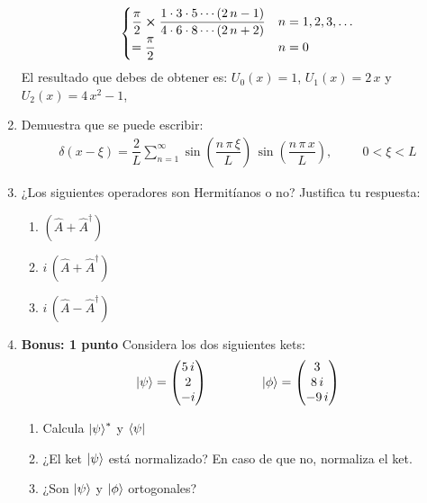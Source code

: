 \begin{enumerate}
\begin{align*}
\begin{cases}
\dfrac{\pi}{2} \cp \dfrac{1 \cdot 3 \cdot 5 \cdots (2 \, n - 1)}{4 \cdot 6 \cdot 8 \cdots (2 \, n + 2)} & n = 1, 2, 3, \ldots \\[0.5em]
= \dfrac{\pi}{2} & n = 0
\end{cases} 
\end{align*}
El resultado que debes de obtener es: $U_{0}(x) = 1$, $U_{1}(x) = 2 \, x$ y $U_{2}(x) = 4 \, x^{2} - 1$,
\item Demuestra que se puede escribir:
\begin{align*}
\delta(x - \xi) = \dfrac{2}{L} \sum_{n=1}^{\infty} \sin \left( \dfrac{n \, \pi \, \xi}{L} \right) \, \sin \left( \dfrac{n \, \pi \, x}{L} \right), \hspace{1cm} 0 < \xi < L
\end{align*}
\item ¿Los siguientes operadores son Hermitíanos o no? Justifica tu respuesta:
\begin{enumerate}
\item $(\hat{A} + \hat{A}^{\dagger})$
\item $i \, (\hat{A} + \hat{A}^{\dagger})$
\item $i \, (\hat{A} - \hat{A}^{\dagger})$
\end{enumerate}
\item \textbf{Bonus: 1 punto} Considera los dos siguientes kets:
\begin{align*}
\ket{\psi} = \mqty(5 \, i \\ 2 \\ -i) \hspace{1.5cm} \ket{\phi} = \mqty(3  \\ 8 \, i \\ - 9 \, i)
\end{align*}
\begin{enumerate}
\item Calcula $\ket{\psi}^{*}$ y $\bra{\psi}$
\item ¿El ket $\ket{\psi}$ está normalizado? En caso de que no, normaliza el ket.
\item ¿Son $\ket{\psi}$ y $\ket{\phi}$ ortogonales?
\end{enumerate}
\end{enumerate}

